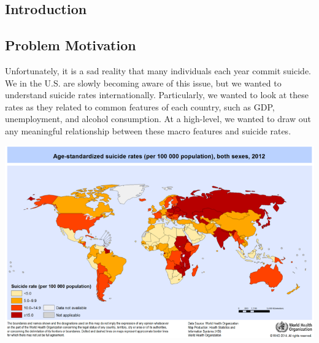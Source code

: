 \documentclass{article}
\begin{document}
\begin{multicols}{2}
\section{Introduction}
\subsection{Problem Motivation} Unfortunately, it is a sad reality that many individuals each year commit suicide. We in the U.S. are slowly becoming aware of this issue, but we wanted to understand suicide rates internationally. Particularly, we wanted to look at these rates as they related to common features of each country, such as GDP, unemployment, and alcohol consumption. At a high-level, we wanted to draw out any meaningful relationship between these macro features and suicide rates.

\begingroup
    \includegraphics[width=\columnwidth]{2012-data-vis-map.png}
    \begin{spacing}{1.2}
    \label{fig:map} 
    \end{spacing}
\endgroup



\end{multicols}
\end{document}
